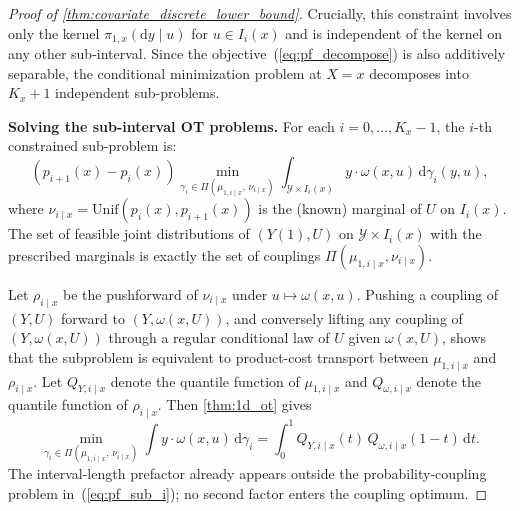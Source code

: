 \begin{proof}[Proof of \cref{thm:covariate_discrete_lower_bound}]
Crucially, this constraint involves only the kernel $\pi_{1,x}(\mathrm{d}y \mid u)$ for $u \in I_i(x)$ and is independent of the kernel on any other sub-interval. Since the objective~(\ref{eq:pf_decompose}) is also additively separable, the conditional minimization problem at $X = x$ decomposes into $K_x + 1$ independent sub-problems.

\medskip
\noindent\textbf{Solving the sub-interval OT problems.}
For each $i = 0, \ldots, K_x - 1$, the $i$-th constrained sub-problem is:
\begin{equation}\label{eq:pf_sub_i}
    (p_{i+1}(x)-p_i(x))\min_{\gamma_i \in \Pi(\mu_{1, i \mid x},\, \nu_{i \mid x})} \int_{\mathcal{Y} \times I_i(x)} y \cdot \omega(x,u)\,\mathrm{d}\gamma_i(y,u),
\end{equation}
where $\nu_{i \mid x} = \mathrm{Unif}(p_i(x), p_{i+1}(x))$ is the (known) marginal of $U$ on $I_i(x)$. The set of feasible joint distributions of $(Y(1), U)$ on $\mathcal{Y} \times I_i(x)$ with the prescribed marginals is exactly the set of couplings $\Pi(\mu_{1, i \mid x}, \nu_{i \mid x})$.

Let $\rho_{i\mid x}$ be the pushforward of $\nu_{i\mid x}$ under $u\mapsto\omega(x,u)$. Pushing a coupling of $(Y,U)$ forward to $(Y,\omega(x,U))$, and conversely lifting any coupling of $(Y,\omega(x,U))$ through a regular conditional law of $U$ given $\omega(x,U)$, shows that the subproblem is equivalent to product-cost transport between $\mu_{1,i\mid x}$ and $\rho_{i\mid x}$. Let $Q_{Y, i \mid x}$ denote the quantile function of $\mu_{1, i \mid x}$ and $Q_{\omega, i \mid x}$ denote the quantile function of $\rho_{i\mid x}$. Then \cref{thm:1d_ot} gives
\begin{equation}\label{eq:pf_ot_sol}
    \min_{\gamma_i \in \Pi(\mu_{1, i \mid x},\, \nu_{i \mid x})} \int y \cdot \omega(x,u)\,\mathrm{d}\gamma_i = \int_0^1 Q_{Y, i \mid x}(t)\,Q_{\omega, i \mid x}(1-t)\,\mathrm{d}t.
\end{equation}
The interval-length prefactor already appears outside the probability-coupling problem in~(\ref{eq:pf_sub_i}); no second factor enters the coupling optimum.


\end{proof}
